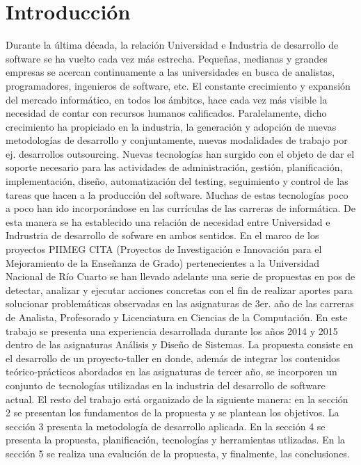 \section{Introducción}
Durante la última década, la relación Universidad e Industria de desarrollo de software se ha vuelto cada vez más estrecha. Pequeñas, medianas y grandes empresas se acercan continuamente a las universidades en busca de analistas, programadores, ingenieros de software, etc.
El constante crecimiento y expansión del mercado informático, en todos los ámbitos, hace cada vez más visible la necesidad de contar con 
recursos humanos calificados. Paralelamente, dicho crecimiento ha propiciado en la industria, la generación y adopción de nuevas 
metodologías de desarrollo y conjuntamente, nuevas modalidades de trabajo por ej. desarrollos outsourcing.
Nuevas tecnologías han surgido con el objeto de dar el soporte necesario para las actividades de administración, 
gestión, planificación, implementación, diseño, automatización del testing, seguimiento y control de las tareas que hacen a la producción 
del software. Muchas de estas tecnologías poco a poco han ido  incorporándose en las currículas de las carreras de informática. De esta manera se ha establecido una relación de necesidad entre Universidad e Indrustria de desarrollo de sofware en ambos sentidos.
En el marco de los proyectos PIIMEG CITA (Proyectos de Investigación e Innovación para el Mejoramiento de la Enseñanza de Grado) pertenecientes a la Universidad Nacional de Río Cuarto se han llevado adelante una serie de propuestas en pos de detectar, analizar y ejecutar acciones concretas con el fin de realizar aportes para solucionar problemáticas observadas en las asignaturas de 3er. año de las carreras de Analista, Profesorado y Licenciatura en Ciencias de la Computación. 
En este trabajo se presenta una experiencia desarrollada durante los años 2014 y 2015 dentro de las asignaturas Análisis y Diseño de Sistemas. 
La propuesta consiste en el desarrollo de un proyecto-taller en donde, además de integrar los contenidos teórico-prácticos abordados en las 
asignaturas de tercer año, se incorporen un conjunto de tecnologías utilizadas en la industria del desarrollo de software actual. 
El resto del trabajo está organizado de la siguiente manera: en la sección 2 se presentan los fundamentos de la propuesta y se plantean los 
objetivos. La sección 3 presenta la metodología de desarrollo aplicada. En la sección 4 se presenta la propuesta, planificación, 
tecnologías y herramientas utlizadas. En la sección 5 se realiza una evalución de la propuesta, y finalmente, las conclusiones.